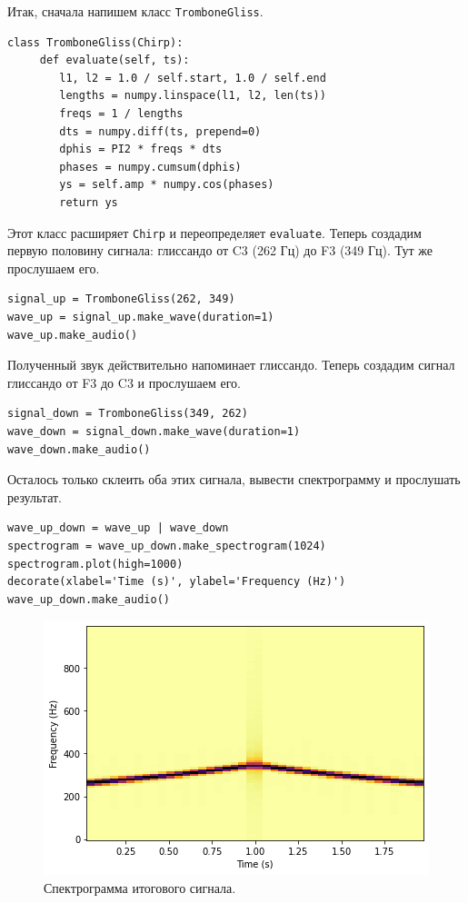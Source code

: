 \documentclass[a4paper, 14pt]{extarticle}
\begin{document}
    Итак, сначала напишем класс \texttt{TromboneGliss}.

    \begin{lstlisting}[caption= Класс \texttt{TromboneGliss}., label={lst:task5_class}]
class TromboneGliss(Chirp):
     def evaluate(self, ts):
        l1, l2 = 1.0 / self.start, 1.0 / self.end
        lengths = numpy.linspace(l1, l2, len(ts))
        freqs = 1 / lengths
        dts = numpy.diff(ts, prepend=0)
        dphis = PI2 * freqs * dts
        phases = numpy.cumsum(dphis)
        ys = self.amp * numpy.cos(phases)
        return ys
    \end{lstlisting}

    Этот класс расширяет \texttt{Chirp} и переопределяет \texttt{evaluate}. Теперь создадим первую половину сигнала:
    глиссандо от C3 (262 Гц) до F3 (349 Гц). Тут же прослушаем его.

    \begin{lstlisting}[caption= Создание сигнала глиссандо от C3 до F3., label={lst:task5_signal_up}]
signal_up = TromboneGliss(262, 349)
wave_up = signal_up.make_wave(duration=1)
wave_up.make_audio()
    \end{lstlisting}

    Полученный звук действительно напоминает глиссандо. Теперь создадим сигнал глиссандо от F3 до C3 и прослушаем его.

    \begin{lstlisting}[caption= Создание сигнала глиссандо от F3 до C3., label={lst:task5_signal_down}]
signal_down = TromboneGliss(349, 262)
wave_down = signal_down.make_wave(duration=1)
wave_down.make_audio()
    \end{lstlisting}

    Осталось только склеить оба этих сигнала, вывести спектрограмму и прослушать результат.

    \begin{lstlisting}[caption= Создание итогового сигнала и получение его спектрограммы., label={lst:task5_signal_result}]
wave_up_down = wave_up | wave_down
spectrogram = wave_up_down.make_spectrogram(1024)
spectrogram.plot(high=1000)
decorate(xlabel='Time (s)', ylabel='Frequency (Hz)')
wave_up_down.make_audio()
    \end{lstlisting}

    \begin{figure}[h]
        \centering
        \includegraphics[width=0.8\linewidth]{resources/Images/task5_spectrogram}
        \caption{Спектрограмма итогового сигнала.}
        \label{fig:task5_spectrogram}
    \end{figure}
\end{document}
